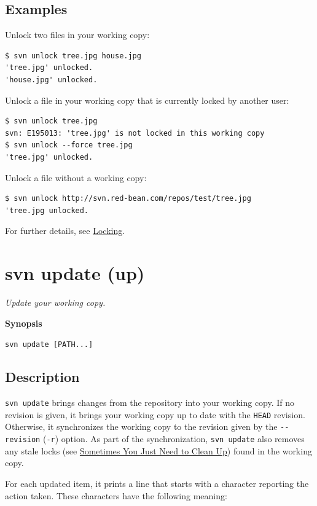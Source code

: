 \subsection{Examples}

Unlock two files in your working copy:

\begin{verbatim}
$ svn unlock tree.jpg house.jpg
'tree.jpg' unlocked.
'house.jpg' unlocked.
\end{verbatim}

Unlock a file in your working copy that is currently locked by another
user:

\begin{verbatim}
$ svn unlock tree.jpg
svn: E195013: 'tree.jpg' is not locked in this working copy
$ svn unlock --force tree.jpg
'tree.jpg' unlocked.
\end{verbatim}

Unlock a file without a working copy:

\begin{verbatim}
$ svn unlock http://svn.red-bean.com/repos/test/tree.jpg
'tree.jpg unlocked.
\end{verbatim}

For further details, see \hyperref[svn.advanced.locking]{Locking}.

\section{svn update (up)}\label{svn.ref.svn.c.update}

\emph{Update your working copy.}

\textbf{Synopsis}

\texttt{svn\ update\ {[}PATH...{]}}

\subsection{Description}

\texttt{svn\ update} brings changes from the repository into your
working copy. If no revision is given, it brings your working copy up to
date with the \texttt{HEAD} revision. Otherwise, it synchronizes the
working copy to the revision given by the \texttt{-\/-revision}
(\texttt{-r}) option. As part of the synchronization,
\texttt{svn\ update} also removes any stale locks (see
\hyperref[svn.tour.cleanup]{Sometimes You Just Need to Clean Up}) found
in the working copy.

For each updated item, it prints a line that starts with a character
reporting the action taken. These characters have the following meaning:

